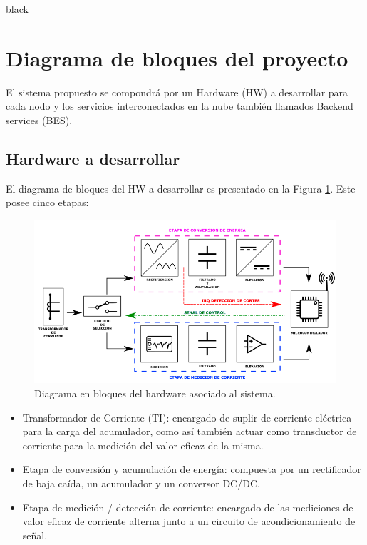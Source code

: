 \documentclass[11pt]{charter}
\begin{document}
\begin{consigna}{black}
\section{Diagrama de bloques del proyecto}
El sistema propuesto se compondrá por un Hardware (HW) a desarrollar para cada nodo y los servicios interconectados en la nube también llamados Backend services (BES).\\
\subsection{Hardware a desarrollar}
\label{sec:diagrama_de_bloques_HW}

El diagrama de bloques del HW a desarrollar es presentado en la Figura \ref{fig:diagBloques}. Este posee cinco etapas:
\vspace{25px}

\begin{figure}[H]
	\centering 
	\includegraphics[width=.7\textwidth]{./Figuras/HW_block_diagram.png}
	\caption{Diagrama en bloques del hardware asociado al sistema.}
	\label{fig:diagBloques}
\end{figure}

\vspace{15px}
\begin{itemize}
	\item Transformador de Corriente (TI): encargado de suplir de corriente eléctrica para la carga del acumulador, como así también actuar como  transductor de corriente para la medición del valor eficaz de la misma.\\

	\item Etapa de conversión y acumulación de energía: compuesta por un rectificador de baja caída, un acumulador y un conversor DC/DC.\\

	\item Etapa de medición / detección de corriente: encargado de las mediciones de valor eficaz de corriente alterna junto a un circuito de acondicionamiento de señal.\\


\end{itemize}
\end{consigna}
\end{document}
